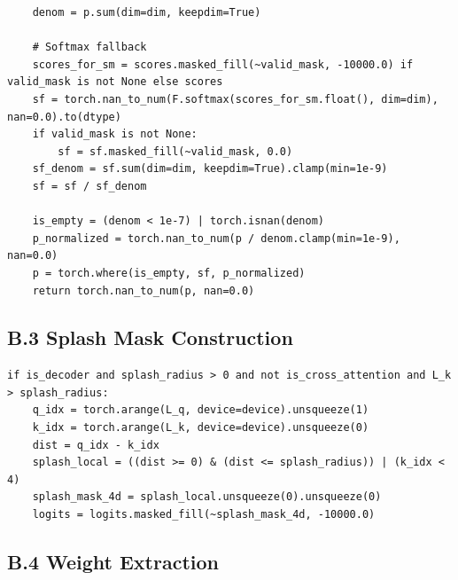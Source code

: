 \begin{lstlisting}
    denom = p.sum(dim=dim, keepdim=True)
    
    # Softmax fallback
    scores_for_sm = scores.masked_fill(~valid_mask, -10000.0) if valid_mask is not None else scores
    sf = torch.nan_to_num(F.softmax(scores_for_sm.float(), dim=dim), nan=0.0).to(dtype)
    if valid_mask is not None:
        sf = sf.masked_fill(~valid_mask, 0.0)
    sf_denom = sf.sum(dim=dim, keepdim=True).clamp(min=1e-9)
    sf = sf / sf_denom
    
    is_empty = (denom < 1e-7) | torch.isnan(denom)
    p_normalized = torch.nan_to_num(p / denom.clamp(min=1e-9), nan=0.0)
    p = torch.where(is_empty, sf, p_normalized)
    return torch.nan_to_num(p, nan=0.0)
\end{lstlisting}

\subsection{B.3 Splash Mask Construction}

\begin{lstlisting}
if is_decoder and splash_radius > 0 and not is_cross_attention and L_k > splash_radius:
    q_idx = torch.arange(L_q, device=device).unsqueeze(1)
    k_idx = torch.arange(L_k, device=device).unsqueeze(0)
    dist = q_idx - k_idx
    splash_local = ((dist >= 0) & (dist <= splash_radius)) | (k_idx < 4)
    splash_mask_4d = splash_local.unsqueeze(0).unsqueeze(0)
    logits = logits.masked_fill(~splash_mask_4d, -10000.0)
\end{lstlisting}

\subsection{B.4 Weight Extraction}

